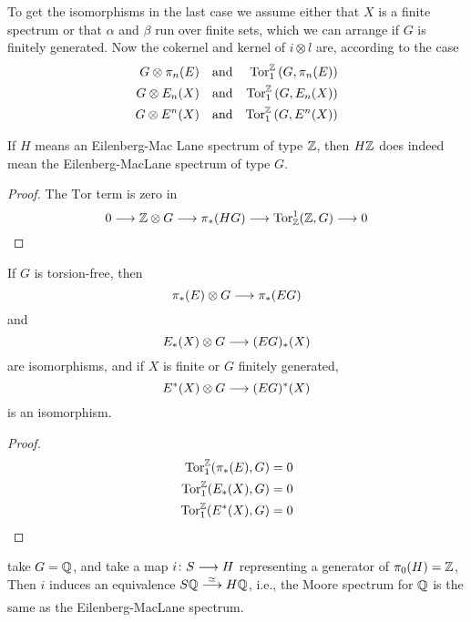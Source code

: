 \documentclass[../main]{subfiles}
\begin{document}
To get the isomorphisms in the last case we assume either that $X$ is a finite spectrum or that $\alpha$ and $\beta$ run over finite sets, which we can arrange if $G$ is finitely generated. Now the cokernel and kernel of $i\otimes l$ are, according to the case
\begin{align}
    G\otimes \pi_n(E) && \text{and} && \mathrm{Tor}_1^{\mathbb{Z}} \left( G, \pi_n(E) \right) \nonumber \\
    G\otimes E_n(X) && \text{and} && \mathrm{Tor}_1^{\mathbb{Z}} \left( G, E_n(X) \right) \nonumber \\
    G\otimes E^n(X) && \text{and} && \mathrm{Tor}_1^{\mathbb{Z}} \left( G, E^n(X) \right) \nonumber
\end{align}

\begin{example}
If $H$ means an Eilenberg-Mac Lane spectrum of type $\mathbb{Z}$, then $H\mathbb{Z}$ does indeed mean the Eilenberg-MacLane spectrum of type $G$.
\end{example}

\begin{proof}
The $\mathrm{Tor}$ term is zero in
\[0\longrightarrow \mathbb{Z}\otimes G\longrightarrow \pi_\ast(HG)\longrightarrow \mathrm{Tor}_{\mathbb{Z}}^1(\mathbb{Z}, G)\longrightarrow 0\]
\end{proof}


\begin{proposition}\label{prop:p3c06.7}
If $G$ is torsion-free, then
\[\pi_\ast (E)\otimes G\longrightarrow \pi_\ast(EG)\]
and
\[E_\ast(X)\otimes G\longrightarrow (EG)_\ast(X)\]
are isomorphisms, and if $X$ is finite or $G$ finitely generated,
\[E^\ast(X)\otimes G\longrightarrow (EG)^\ast (X)\]
is an isomorphism.
\end{proposition}

\begin{proof}
\begin{align}
    \mathrm{Tor}_1^{\mathbb{Z}}(\pi_\ast(E), G) &= 0 \nonumber \\
    \mathrm{Tor}_1^{\mathbb{Z}}(E_\ast(X), G) &= 0 \nonumber \\
    \mathrm{Tor}_1^{\mathbb{Z}}(E^\ast(X), G) &= 0 \nonumber
\end{align}
\end{proof}

\begin{example}
take $G=\mathbb{Q}$, and take a map $i\colon S \longrightarrow H$ representing a generator of $\pi_0(H)=\mathbb{Z}$, Then $i$ induces an equivalence $S\bQ\vra{\simeq}H\bQ$, i.e., the Moore spectrum for $\mathbb{Q}$ is the same as the Eilenberg-MacLane spectrum.
\end{example}
\end{document}

